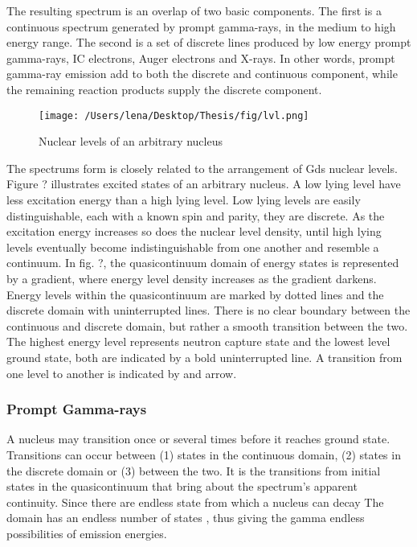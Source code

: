 The resulting spectrum is an overlap of two basic components. The first is a continuous spectrum generated by prompt gamma-rays, in the medium to high energy range. The second is a set of discrete lines produced by low energy prompt gamma-rays, IC electrons, Auger electrons and X-rays. In other words, prompt gamma-ray emission add to both the discrete and continuous component, while the remaining reaction products supply the discrete component.
\begin{figure}[h]
\centering
	\texttt{[image: /Users/lena/Desktop/Thesis/fig/lvl.png]}
	\caption{Nuclear levels of an arbitrary nucleus}
	\label{fig:1}
\end{figure}
The spectrums form is closely related to the arrangement of Gds nuclear levels.
Figure ? illustrates excited states of an arbitrary nucleus. A low lying level have less excitation energy than a high lying level. Low lying levels are easily distinguishable, each with a known spin and parity, they are discrete. As the excitation energy increases so does the nuclear level density, until high lying levels eventually become indistinguishable from one another and resemble a continuum. In fig. ?, the quasicontinuum domain of energy states is represented by a gradient, where energy level density increases as the gradient darkens. Energy levels within the quasicontinuum are marked by dotted lines and the discrete domain with uninterrupted lines. There is no clear boundary between the continuous and discrete domain, but rather a smooth transition between the two. The highest energy level represents neutron capture state and the lowest level ground state, both are indicated by a bold uninterrupted line. A transition from one level to another is indicated by and arrow.

\subsubsection{Prompt Gamma-rays}
A nucleus may transition once or several times before it reaches ground state.
Transitions can occur between (1) states in the continuous domain, (2) states in the discrete domain or (3) between the two. It is the transitions from initial states in the quasicontinuum that bring about the spectrum’s apparent continuity. Since there are endless state from which a nucleus can decay The domain has an endless number of states , thus giving the gamma endless possibilities of emission energies.


